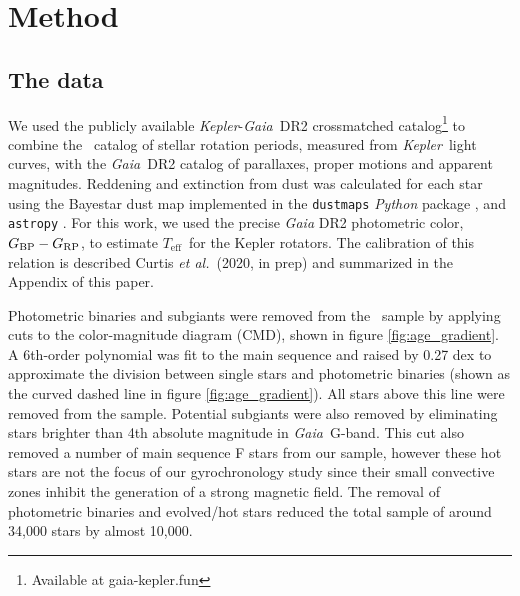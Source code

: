 \documentclass{aastex63}
\newcommand{\etal}{{\it et al.}}
\newcommand{\kepler}{{\it Kepler}}
\newcommand{\gaia}{{\it Gaia}}
\newcommand{\teff}{$T_{\mathrm{eff}}$}
\newcommand{\mct}{\citet{mcquillan2014}}
\newcommand{\racomment}[1]{{\color{blue}#1}}
\begin{document}
\section{Method}
\label{sec:method}

\subsection{The data}
\label{sec:the_data}

We used the publicly available \kepler-\gaia\ DR2 crossmatched
catalog\footnote{Available at gaia-kepler.fun} to combine the \mct\ catalog of
stellar rotation periods, measured from \kepler\ light curves, with the \gaia\
DR2 catalog of parallaxes, proper motions and apparent magnitudes.
Reddening and extinction from dust was calculated for each star using the
Bayestar dust map implemented in the {\tt dustmaps} {\it Python} package
\citep{green2018}, and {\tt astropy} \citep{astropy2013, astropy2018}.
For this work, we used the precise \textit{Gaia} DR2 photometric color,
$G_{\rm BP} - G_{\rm RP}$, to estimate \teff\ for the Kepler rotators.
\racomment{The calibration of this relation is described Curtis \etal\ (2020,
in prep) and summarized in the Appendix of this paper.}

Photometric binaries and subgiants were removed from the \mct\ sample by
applying cuts to the color-magnitude diagram (CMD), shown in figure
\ref{fig:age_gradient}.
A 6th-order polynomial was fit to the main sequence and raised by 0.27 dex to
approximate the division between single stars and photometric binaries (shown
as the curved dashed line in figure \ref{fig:age_gradient}).
All stars above this line were removed from the sample.
Potential subgiants were also removed by eliminating stars brighter than 4th
absolute magnitude in \gaia\ G-band.
This cut also removed a number of main sequence F stars from our sample,
however these hot stars are not the focus of our gyrochronology study since
their small convective zones inhibit the generation of a strong magnetic
field.
The removal of photometric binaries and evolved/hot stars reduced the total
sample of around 34,000 stars by almost 10,000.
\end{document}

